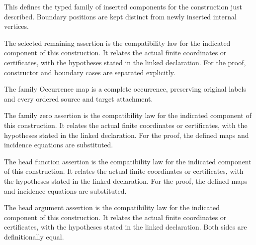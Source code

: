This defines the typed family of inserted components for the construction just described. Boundary positions are kept distinct from newly inserted internal vertices.
\par{}

The selected remaining assertion is the compatibility law for the indicated component of this construction. It relates the actual finite coordinates or certificates, with the hypotheses stated in the linked declaration.
For the proof, constructor and boundary cases are separated explicitly.
\par{}

The family Occurrence map is a complete occurrence, preserving original labels and every ordered source and target attachment.
\par{}

The family zero assertion is the compatibility law for the indicated component of this construction. It relates the actual finite coordinates or certificates, with the hypotheses stated in the linked declaration.
For the proof, the defined maps and incidence equations are substituted.
\par{}

The head function assertion is the compatibility law for the indicated component of this construction. It relates the actual finite coordinates or certificates, with the hypotheses stated in the linked declaration.
For the proof, the defined maps and incidence equations are substituted.
\par{}

The head argument assertion is the compatibility law for the indicated component of this construction. It relates the actual finite coordinates or certificates, with the hypotheses stated in the linked declaration.
Both sides are definitionally equal.
\par{}

